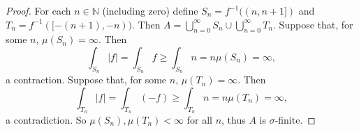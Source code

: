 \documentclass[10pt]{article}
\newcommand{\N}{\mathbb{N}}
\newcommand{\Int}{{\displaystyle \int}}
\begin{document}
\begin{enumerate}
\begin{proof}
For each $n \in \N$ (including zero) define $S_n = f^{-1}((n,n+1])$ and $T_n = f^{-1}([-(n+1),-n))$.  Then $A = \bigcup_{n=0}^\infty S_n \cup \bigcup_{n=0}^\infty T_n$.  Suppose that, for some $n$, $\mu(S_n) = \infty$.  Then
$$
\Int_{S_n} |f| = \Int_{S_n} f \geq \Int_{S_n} n = n\mu(S_n) = \infty,
$$
a contraction.  Suppose that, for some $n$, $\mu(T_n) = \infty$.  Then
$$
\Int_{T_n} |f| = \Int_{T_n} (-f) \geq \Int_{T_n} n = n\mu(T_n) = \infty,
$$
a contradiction.  So $\mu(S_n), \mu(T_n) < \infty$ for all $n$, thus $A$ is $\sigma$-finite.
\end{proof}

\end{enumerate}
\end{document}
